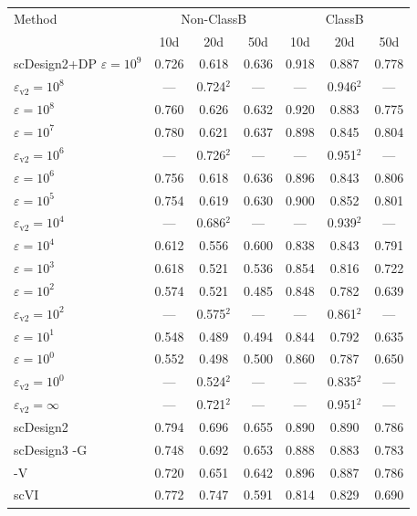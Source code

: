 \begin{tabular}{lccc|ccc}
\toprule
Method & \multicolumn{3}{c}{Non-ClassB} & \multicolumn{3}{c}{ClassB} \\
 & 10d & 20d & 50d & 10d & 20d & 50d \\
\midrule
scDesign2+DP $\varepsilon=10^{9}$ & 0.726 & 0.618 & 0.636 & 0.918 & 0.887 & 0.778 \\
$\varepsilon_{\text{v2}}=10^{8}$ & --- & 0.724$^{2}$ & --- & --- & 0.946$^{2}$ & --- \\
$\varepsilon=10^{8}$ & 0.760 & 0.626 & 0.632 & 0.920 & 0.883 & 0.775 \\
$\varepsilon=10^{7}$ & 0.780 & 0.621 & 0.637 & 0.898 & 0.845 & 0.804 \\
$\varepsilon_{\text{v2}}=10^{6}$ & --- & 0.726$^{2}$ & --- & --- & 0.951$^{2}$ & --- \\
$\varepsilon=10^{6}$ & 0.756 & 0.618 & 0.636 & 0.896 & 0.843 & 0.806 \\
$\varepsilon=10^{5}$ & 0.754 & 0.619 & 0.630 & 0.900 & 0.852 & 0.801 \\
$\varepsilon_{\text{v2}}=10^{4}$ & --- & 0.686$^{2}$ & --- & --- & 0.939$^{2}$ & --- \\
$\varepsilon=10^{4}$ & 0.612 & 0.556 & 0.600 & 0.838 & 0.843 & 0.791 \\
$\varepsilon=10^{3}$ & 0.618 & 0.521 & 0.536 & 0.854 & 0.816 & 0.722 \\
$\varepsilon=10^{2}$ & 0.574 & 0.521 & 0.485 & 0.848 & 0.782 & 0.639 \\
$\varepsilon_{\text{v2}}=10^{2}$ & --- & 0.575$^{2}$ & --- & --- & 0.861$^{2}$ & --- \\
$\varepsilon=10^{1}$ & 0.548 & 0.489 & 0.494 & 0.844 & 0.792 & 0.635 \\
$\varepsilon=10^{0}$ & 0.552 & 0.498 & 0.500 & 0.860 & 0.787 & 0.650 \\
$\varepsilon_{\text{v2}}=10^{0}$ & --- & 0.524$^{2}$ & --- & --- & 0.835$^{2}$ & --- \\
$\varepsilon_{\text{v2}}=\infty$ & --- & 0.721$^{2}$ & --- & --- & 0.951$^{2}$ & --- \\
\addlinespace[2pt]
scDesign2 & 0.794 & 0.696 & 0.655 & 0.890 & 0.890 & 0.786 \\
scDesign3 -G & 0.748 & 0.692 & 0.653 & 0.888 & 0.883 & 0.783 \\
-V & 0.720 & 0.651 & 0.642 & 0.896 & 0.887 & 0.786 \\
\addlinespace[2pt]
scVI & 0.772 & 0.747 & 0.591 & 0.814 & 0.829 & 0.690 \\

\end{tabular}
